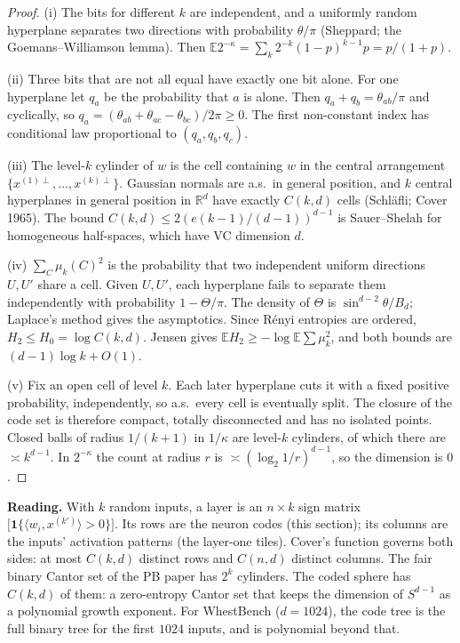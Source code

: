 \documentclass[11pt]{article}
\theoremstyle{definition}
\theoremstyle{remark}
\newcommand{\R}{\mathbb R}
\newcommand{\E}{\mathbb E}
\begin{document}
\begin{proof}
(i) The bits for different $k$ are independent, and a uniformly random hyperplane separates two directions with probability $\theta/\pi$ (Sheppard; the Goemans--Williamson lemma). Then $\E2^{-\kappa}=\sum_k2^{-k}(1-p)^{k-1}p=p/(1+p)$.

(ii) Three bits that are not all equal have exactly one bit alone. For one hyperplane let $q_a$ be the probability that $a$ is alone. Then $q_a+q_b=\theta_{ab}/\pi$ and cyclically, so $q_a=(\theta_{ab}+\theta_{ac}-\theta_{bc})/2\pi\ge0$. The first non-constant index has conditional law proportional to $(q_a,q_b,q_c)$.

(iii) The level-$k$ cylinder of $w$ is the cell containing $w$ in the central arrangement $\{x^{(1)\perp},\dots,x^{(k)\perp}\}$. Gaussian normals are a.s.\ in general position, and $k$ central hyperplanes in general position in $\R^d$ have exactly $C(k,d)$ cells (Schl\"afli; Cover 1965). The bound $C(k,d)\le2(e(k-1)/(d-1))^{d-1}$ is Sauer--Shelah for homogeneous half-spaces, which have VC dimension $d$.

(iv) $\sum_C\mu_k(C)^2$ is the probability that two independent uniform directions $U,U'$ share a cell. Given $U,U'$, each hyperplane fails to separate them independently with probability $1-\Theta/\pi$. The density of $\Theta$ is $\sin^{d-2}\theta/B_d$; Laplace's method gives the asymptotics. Since R\'enyi entropies are ordered, $H_2\le H_0=\log C(k,d)$. Jensen gives $\E H_2\ge-\log\E\sum\mu_k^2$, and both bounds are $(d-1)\log k+O(1)$.

(v) Fix an open cell of level $k$. Each later hyperplane cuts it with a fixed positive probability, independently, so a.s.\ every cell is eventually split. The closure of the code set is therefore compact, totally disconnected and has no isolated points. Closed balls of radius $1/(k+1)$ in $1/\kappa$ are level-$k$ cylinders, of which there are $\asymp k^{d-1}$. In $2^{-\kappa}$ the count at radius $r$ is $\asymp(\log_2 1/r)^{d-1}$, so the dimension is $0$.
\end{proof}

\textbf{Reading.} With $k$ random inputs, a layer is an $n\times k$ sign matrix $\big[\mathbf 1\{\langle w_i,x^{(k')}\rangle>0\}\big]$. Its rows are the neuron codes (this section); its columns are the inputs' activation patterns (the layer-one tiles). Cover's function governs both sides: at most $C(k,d)$ distinct rows and $C(n,d)$ distinct columns. The fair binary Cantor set of the PB paper has $2^k$ cylinders. The coded sphere has $C(k,d)$ of them: a zero-entropy Cantor set that keeps the dimension of $S^{d-1}$ as a polynomial growth exponent. For WhestBench ($d=1024$), the code tree is the full binary tree for the first $1024$ inputs, and is polynomial beyond that.
\end{document}

